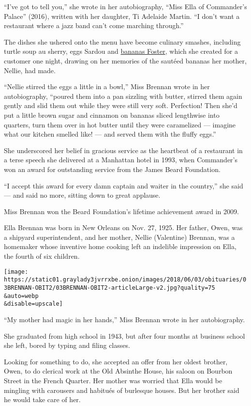 ``I've got to tell you,'' she wrote in her autobiography, ``Miss Ella of
Commander's Palace'' (2016), written with her daughter, Ti Adelaide
Martin. ``I don't want a restaurant where a jazz band can't come
marching through.''

The dishes she ushered onto the menu have become culinary smashes,
including turtle soup au sherry, eggs Sardou and
\href{https://www.npr.org/sections/thesalt/2016/09/30/493157144/the-sweet-success-of-bananas-foster-has-an-unsavory-past}{bananas
Foster}, which she created for a customer one night, drawing on her
memories of the sautéed bananas her mother, Nellie, had made.

``Nellie stirred the eggs a little in a bowl,'' Miss Brennan wrote in
her autobiography, ``poured them into a pan sizzling with butter,
stirred them again gently and slid them out while they were still very
soft. Perfection! Then she'd put a little brown sugar and cinnamon on
bananas sliced lengthwise into quarters, turn them over in hot butter
until they were caramelized --- imagine what our kitchen smelled like!
--- and served them with the fluffy eggs.''

She underscored her belief in gracious service as the heartbeat of a
restaurant in a terse speech she delivered at a Manhattan hotel in 1993,
when Commander's won an award for outstanding service from the James
Beard Foundation.

``I accept this award for every damn captain and waiter in the
country,'' she said --- and said no more, sitting down to great
applause.

Miss Brennan won the Beard Foundation's lifetime achievement award in
2009.

Ella Brennan was born in New Orleans on Nov. 27, 1925. Her father, Owen,
was a shipyard superintendent, and her mother, Nellie (Valentine)
Brennan, was a homemaker whose inventive home cooking left an indelible
impression on Ella, the fourth of six children.

\texttt{[image: https://static01.graylady3jvrrxbe.onion/images/2018/06/03/obituaries/03BRENNAN-OBIT2/03BRENNAN-OBIT2-articleLarge-v2.jpg?quality=75\\\&auto=webp\\\&disable=upscale]}

``My mother had magic in her hands,'' Miss Brennan wrote in her
autobiography.

She graduated from high school in 1943, but after four months at
business school she left, bored by typing and filing classes.

Looking for something to do, she accepted an offer from her oldest
brother, Owen, to do clerical work at the Old Absinthe House, his saloon
on Bourbon Street in the French Quarter. Her mother was worried that
Ella would be mingling with carousers and habitués of burlesque houses.
But her brother said he would take care of her.

